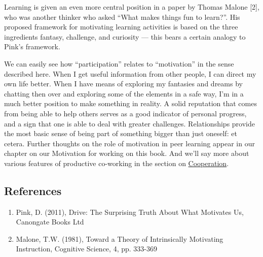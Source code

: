 Learning is given an even more central position in a paper by Thomas
Malone {[}2{]}, who was another thinker who asked ``What makes things
fun to learn?''. His proposed framework for motivating learning
activities is based on the three ingredients fantasy, challenge, and
curiosity --- this bears a certain analogy to Pink's framework.

We can easily see how ``participation'' relates to ``motivation'' in the
sense described here. When I get useful information from other people, I
can direct my own life better. When I have means of exploring my
fantasies and dreams by chatting then over and exploring some of the
elements in a safe way, I'm in a much better position to make something
in reality. A solid reputation that comes from being able to help others
serves as a good indicator of personal progress, and a sign that one is
able to deal with greater challenges. Relationships provide the most
basic sense of being part of something bigger than just oneself: et
cetera. Further thoughts on the role of motivation in peer learning
appear in our chapter on our Motivation for working on this book. And
we'll say more about various features of productive co-working in the
section on \href{http://peeragogy.org/cowork/}{Cooperation}.

\subsection{References}

\begin{enumerate}
\item
  Pink, D. (2011), Drive: The Surprising Truth About What Motivates Us,
  Canongate Books Ltd
\item
  Malone, T.W. (1981), Toward a Theory of Intrinsically Motivating
  Instruction, Cognitive Science, 4, pp. 333-369
\end{enumerate}
